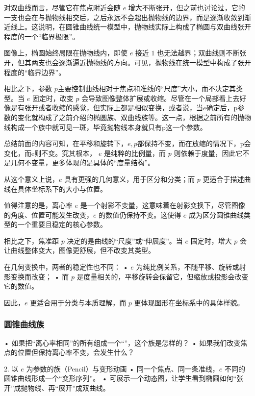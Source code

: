 对双曲线而言，尽管它在焦点附近会随 $e$ 增大不断张开，但之前也讨论过，它的一支也会在与抛物线相交后，之后永远不会超出抛物线的边界，而是逐渐收敛到渐近线上。这说明，在圆锥曲线统一模型中，抛物线实际上构成了椭圆与双曲线张开程度的一个“临界极限”。

图像上，椭圆始终局限在抛物线内，即使 $e$ 接近 $1$ 也无法越界；双曲线则不断张开，但其两支也会逐渐逼近抛物线的方向。可见，抛物线在统一模型中构成了张开程度的“临界边界”。

相比之下，参数 $p$主要控制曲线相对于焦点和准线的“尺度”大小，而不决定其类型。当 $e$ 固定时，改变 $p$ 会导致图像整体扩展或收缩。尽管在一个局部看上去好像是有张开或者收缩的感觉，但实际上都是相似变换，或者说，当$e$确定后，p参数的变化就构成了之前介绍的椭圆族、双曲线族等。这一点，根据之前所有的抛物线构成一个族中就可见一斑，毕竟抛物线本身就只有p这一个参数。

总结前面的内容可知，在平移和旋转下，$e,p$都保持不变，而在放缩的情况下，p会变化，而e则不变。究其根本， $e$ 是纯粹的比例量，而 $p$ 则依赖于度量，因此它不是几何不变量，更多体现的是具体的“度量结构”。

从这个意义上说，$e$ 具有更强的几何意义，用于区分和分类；而 $p$ 更适合于描述曲线在具体坐标系下的大小与位置。

值得注意的是，离心率 $e$ 是一个射影不变量，这意味着在射影变换下，尽管图像的角度、位置可能发生改变，$e$ 的数值仍保持不变。这使得 $e$ 成为区分圆锥曲线类型的一个重要且稳定的核心参数。

相比之下，焦准距 $p$ 决定的是曲线的“尺度”或“伸展度”。当 $e$ 固定时，增大 $p$ 会让曲线整体变大，图像更舒展，但不改变其类型。

在几何变换中，两者的稳定性也不同：
	•	$e$ 为纯比例关系，不随平移、旋转或射影变换而改变；
	•	而 $p$ 是度量相关的，平移旋转会保留它，但缩放或投影会改变它的数值。

因此，$e$ 更适合用于分类与本质理解，而 $p$ 更体现图形在坐标系中的具体样貌。



\subsubsection{圆锥曲线族}

	•	如果把“离心率相同”的所有组成一个“”，这个族是怎样的？
	•	如果我们改变焦点的位置但保持离心率不变，会发生什么？

2. 以 $e$ 为参数的族（Pencil）与变形动画
	•	同一个焦点、同一条准线，$e$ 不同的圆锥曲线形成一个“变形序列”。
	•	可展示一个动态图，让学生看到椭圆如何“张开”成抛物线、再“展开”成双曲线。
	
